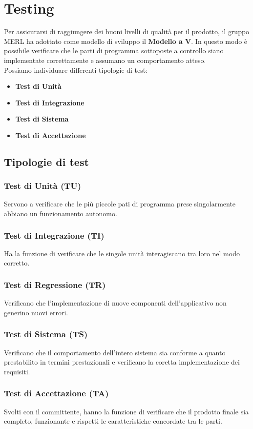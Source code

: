 \chapter{Testing}
Per assicurarsi di raggiungere dei buoni livelli di qualità per il prodotto, il gruppo MERL 
ha adottato come modello di sviluppo il \textbf{Modello a V}. In questo modo è possibile verificare 
che le parti di programma sottoposte a controllo siano implementate correttamente e assumano un 
comportamento atteso.
\\Possiamo individuare differenti tipologie di test:
    \begin{itemize}
        \item \textbf{Test di Unità}
        \item \textbf{Test di Integrazione} 
        \item \textbf{Test di Sistema}
        \item \textbf{Test di Accettazione}
        
    \end{itemize}

\section{Tipologie di test}
    \subsection{Test di Unità (TU)}  Servono a verificare che le più piccole pati di programma prese singolarmente abbiano un funzionamento autonomo.
    \subsection{Test di Integrazione (TI)} Ha la funzione di verificare che le singole unità interagiscano tra loro nel modo corretto.
    \subsection{Test di Regressione (TR)} Verificano che l'implementazione di nuove componenti dell'applicativo non generino nuovi errori. 
    \subsection{Test di Sistema (TS)} Verificano che il comportamento dell'intero sistema sia conforme a quanto prestabilito in termini prestazionali e verificano la coretta implementazione dei requisiti.
    \subsection{Test di Accettazione (TA)} Svolti con il committente, hanno la funzione di verificare che il prodotto 
        finale sia completo, funzionante e rispetti le caratteristiche concordate tra le parti.


